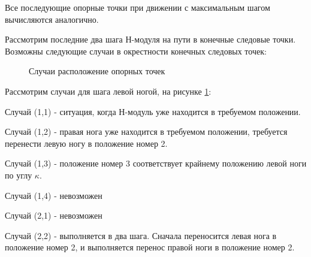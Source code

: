 Все последующие опорные точки при движении с максимальным шагом вычисляются аналогично.






Рассмотрим последние два шага Н-модуля на пути в конечные следовые точки. Возможны следующие случаи в окрестности конечных следовых точек:
\begin{figure}[h]
\caption{Случаи расположение опорных точек}
\label{stepcase}
\end{figure}

Рассмотрим случаи для шага левой ногой, на рисунке \ref{stepcase}:

Случай (1,1) -  ситуация, когда Н-модуль уже находится в требуемом положении.

Случай (1,2) - правая нога уже находится в требуемом положении, требуется перенести левую ногу в положение номер 2.

Случай (1,3) - положение номер 3 соответствует крайнему положению левой ноги по углу $\kappa$. 

Случай (1,4) - невозможен

Случай (2,1) - невозможен

Случай (2,2) - выполняется в два шага. Сначала переносится левая нога в положение номер 2, и выполняется перенос правой ноги в положение номер 2.

